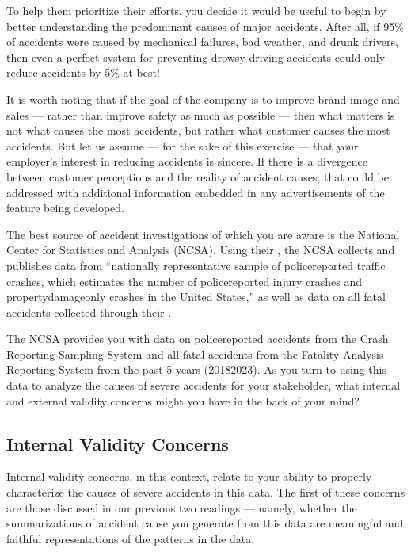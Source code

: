 \documentclass[letterpaper,10pt,english]{jupyterBook}
\begin{document}
\sphinxAtStartPar
To help them prioritize their efforts, you decide it would be useful to begin by better understanding the predominant causes of major accidents. After all, if 95\% of accidents were caused by mechanical failures, bad weather, and drunk drivers, then even a perfect system for preventing drowsy driving accidents could only reduce accidents by 5\% at best!%
\begin{footnote}[1]\sphinxAtStartFootnote
It is worth noting that if the goal of the company is to improve brand image and sales — rather than improve safety as much as possible — then what matters is not what  causes the most accidents, but rather what customer  causes the most accidents. But let us assume — for the sake of this exercise — that your employer’s interest in reducing accidents is sincere. If there is a divergence between customer perceptions and the reality of accident causes, that could be addressed with additional information embedded in any advertisements of the feature being developed.
%
\end{footnote}

\sphinxAtStartPar
The best source of accident investigations of which you are aware is the  National Center for Statistics and Analysis (NCSA). Using their , the NCSA collects and publishes data from “nationally representative sample of police\sphinxhyphen{}reported traffic crashes, which estimates the number of police\sphinxhyphen{}reported injury crashes and property\sphinxhyphen{}damage\sphinxhyphen{}only crashes in the United States,” as well as data on all fatal accidents collected through their .

\sphinxAtStartPar
The NCSA provides you with data on police\sphinxhyphen{}reported accidents from the Crash Reporting Sampling System and all fatal accidents from the Fatality Analysis Reporting System from the past 5 years (2018\sphinxhyphen{}2023). As you turn to using this data to analyze the causes of severe accidents for your stakeholder, what internal and external validity concerns might you have in the back of your mind?


\subsection{Internal Validity Concerns}
\label{\detokenize{30_questions/15_answering_exploratory_questions:internal-validity-concerns}}
\sphinxAtStartPar
Internal validity concerns, in this context, relate to your ability to properly characterize the causes of severe accidents in this data. The first of these concerns are those discussed in our previous two readings — namely, whether the summarizations of accident cause you generate from this data are meaningful and faithful representations of the patterns in the data.
\end{document}
